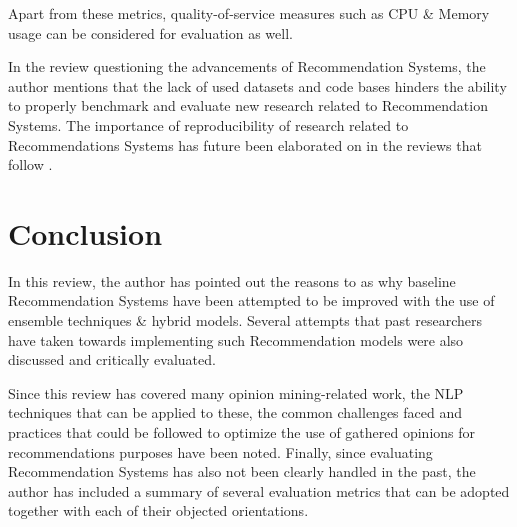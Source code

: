 \documentclass[manuscript,screen,natbib=false]{acmart}
\begin{document}
Apart from these metrics, quality-of-service measures such as CPU \& Memory usage can be considered for evaluation as well. 


In the review questioning the advancements of Recommendation Systems, \cite{dacrema_are_2019} the author mentions that the lack of used datasets and code bases hinders the ability to properly benchmark and evaluate new research related to Recommendation Systems. The importance of reproducibility of research related to Recommendations Systems has future been elaborated on in the reviews that follow \cite{dacrema_troubling_2021, ferrari_dacrema_critically_2020, dacrema_methodological_2020}.


\section{Conclusion}
In this review, the author has pointed out the reasons to as why baseline Recommendation Systems have been attempted to be improved with the use of ensemble techniques \& hybrid models. Several attempts that past researchers have taken towards implementing such Recommendation models were also discussed and critically evaluated.

Since this review has covered many opinion mining-related work, the NLP techniques that can be applied to these, the common challenges faced and practices that could be followed to optimize the use of gathered opinions for recommendations purposes have been noted. Finally, since evaluating Recommendation Systems has also not been clearly handled in the past, the author has included a summary of several evaluation metrics that can be adopted together with each of their objected orientations.



% 
% 
\printbibliography


\end{document}
